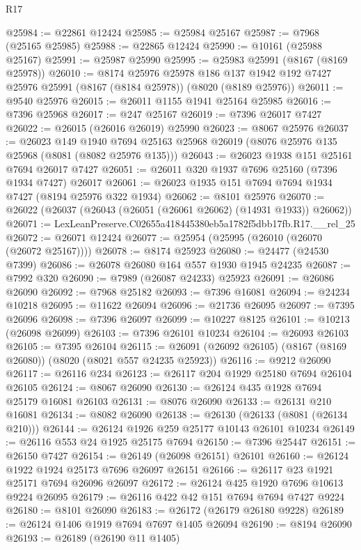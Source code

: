 \begin{lexlean}{R17}
\begin{coremodule}
@25984 := @22861 @12424
@25985 := @25984 @25167
@25987 := @7968 (@25165 @25985)
@25988 := @22865 @12424
@25990 := @10161 (@25988 @25167)
@25991 := @25987 @25990
@25995 := @25983 @25991 (@8167 (@8169 @25978))
@26010 := @8174
    @25976
    @25978
    @186
    @137
    @1942
    @192
    @7427
    @25976
    @25991
    (@8167 (@8184 @25978))
    (@8020 (@8189 @25976))
@26011 := @9540 @25976
@26015 := @26011 @1155 @1941 @25164 @25985
@26016 := @7396 @25968
@26017 := @247 @25167
@26019 := @7396 @26017 @7427
@26022 := @26015 (@26016 @26019) @25990
@26023 := @8067 @25976
@26037 := @26023
    @149
    @1940
    @7694
    @25163
    @25968
    @26019
    (@8076 @25976 @135 @25968 (@8081 (@8082 @25976 @135)))
@26043 := @26023 @1938 @151 @25161 @7694 @26017 @7427
@26051 := @26011 @320 @1937 @7696 @25160 (@7396 @1934 @7427) @26017
@26061 := @26023 @1935 @151 @7694 @7694 @1934 @7427 (@8194 @25976 @322 @1934)
@26062 := @8101 @25976
@26070 := @26022 (@26037 (@26043 (@26051 (@26061 @26062) (@14931 @1933)) @26062))
@26071 := LexLeanPreserve.C02655a418445380eb5a1782f5dbb17fb.R17.__rel_25
@26072 := @26071 @12424
@26077 := @25954 (@25995 (@26010 (@26070 (@26072 @25167))))
@26078 := @8174 @25923
@26080 := @24477 (@24530 @7399)
@26086 := @26078 @26080 @164 @557 @1930 @1945 @24235
@26087 := @7992 @320
@26090 := @7989 (@26087 @24233) @25923
@26091 := @26086 @26090
@26092 := @7968 @25182
@26093 := @7396 @16081
@26094 := @24234 @10218
@26095 := @11622 @26094
@26096 := @21736 @26095
@26097 := @7395 @26096
@26098 := @7396 @26097
@26099 := @10227 @8125
@26101 := @10213 (@26098 @26099)
@26103 := @7396 @26101 @10234
@26104 := @26093 @26103
@26105 := @7395 @26104
@26115 := @26091 (@26092 @26105) (@8167 (@8169 @26080)) (@8020 (@8021 @557 @24235 @25923))
@26116 := @9212 @26090
@26117 := @26116 @234
@26123 := @26117 @204 @1929 @25180 @7694 @26104 @26105
@26124 := @8067 @26090
@26130 := @26124 @435 @1928 @7694 @25179 @16081 @26103
@26131 := @8076 @26090
@26133 := @26131 @210 @16081
@26134 := @8082 @26090
@26138 := @26130 (@26133 (@8081 (@26134 @210)))
@26144 := @26124 @1926 @259 @25177 @10143 @26101 @10234
@26149 := @26116 @553 @24 @1925 @25175 @7694
@26150 := @7396 @25447
@26151 := @26150 @7427
@26154 := @26149 (@26098 @26151) @26101
@26160 := @26124 @1922 @1924 @25173 @7696 @26097 @26151
@26166 := @26117 @23 @1921 @25171 @7694 @26096 @26097
@26172 := @26124 @425 @1920 @7696 @10613 @9224 @26095
@26179 := @26116 @422 @42 @151 @7694 @7694 @7427 @9224
@26180 := @8101 @26090
@26183 := @26172 (@26179 @26180 @9228)
@26189 := @26124 @1406 @1919 @7694 @7697 @1405 @26094
@26190 := @8194 @26090
@26193 := @26189 (@26190 @11 @1405)

\end{coremodule}
\end{lexlean}
